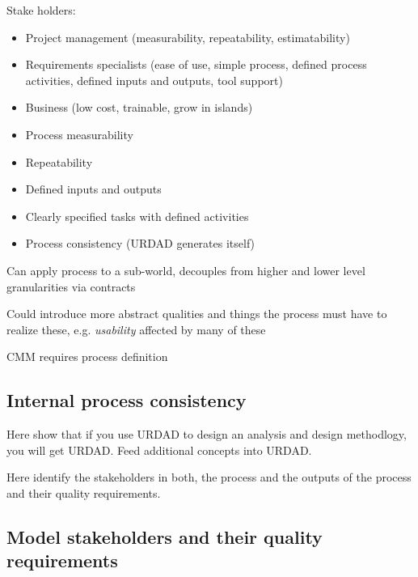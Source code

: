 \cite{berard_what_1995}

Stake holders:
\begin{itemize}
  \item Project management (measurability, repeatability, estimatability)
  \item Requirements specialists (ease of use, simple process, defined process activities, defined inputs and outputs, tool support)
  \item Business (low cost, trainable, grow in islands)
\end{itemize}


\begin{itemize}
  \item Process measurability
  \item Repeatability
  \item Defined inputs and outputs
  \item Clearly specified tasks with defined activities
  \item Process consistency (URDAD generates itself)
\end{itemize}

Can apply process to a sub-world, decouples from higher and lower level granularities via contracts

Could introduce more abstract qualities and things the process must have to realize these, e.g. \emph{usability} affected by many of these

CMM requires process definition


\subsection{Internal process consistency}


Here show that if you use URDAD to design an analysis and design methodlogy, you will get URDAD. Feed additional concepts into URDAD.

Here identify the stakeholders in both, the process and the outputs of the process and their quality requirements.

\subsection{Model stakeholders and their quality requirements}